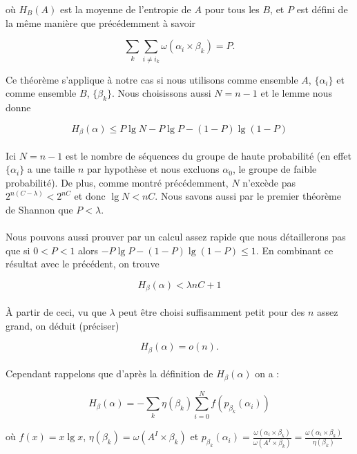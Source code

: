 	
	où $H_B(A)$ est la moyenne de l'entropie de $A$ pour tous
	les $B$, et $P$ est défini de la même manière que précédemment à savoir
	
	\[\sum_k\sum_{i\neq i_k}\omega(\alpha_i \times \beta_k) = P.\]	
	
	Ce théorème s'applique à notre cas si nous utilisons comme ensemble $A$,
	$\{\alpha_i\}$ et comme ensemble $B$, $\{\beta_k\}$. Nous choisissons
	aussi $N = n-1$ et le lemme nous donne
	
	\[H_\beta(\alpha)\le P\lg N - P\lg P - (1-P)\lg(1-P)\]
	
	\paragraph{}
	Ici $N = n-1$ est le nombre de séquences du groupe de haute probabilité 
	(en effet $\{\alpha_i\}$ a une taille $n$ par hypothèse et nous excluons
	$\alpha_0$, le groupe de faible probabilité). De plus, comme montré 
	précédemment, $N$ n'excède pas $2^{n(C-\lambda)}<2^{nC}$ et donc 
	$\lg N<nC$. Nous savons aussi par le premier théorème de Shannon 
	que $P<\lambda$.
	
	\paragraph{}
	Nous pouvons aussi prouver par un calcul assez rapide que nous détaillerons 
	pas que si $0<P<1$ alors $-P\lg P -(1-P)\lg(1-P)\le 1$. En combinant ce 
	résultat avec le précédent,	on trouve
	
	\[H_\beta(\alpha) < \lambda nC + 1\]
	
	\paragraph{}
	À partir de ceci, vu que $\lambda$ peut être choisi suffisamment petit pour
	 des $n$ assez grand, on déduit (préciser)
	
	\[H_\beta(\alpha)=o(n).\]
	
	\paragraph{}
	Cependant rappelons que d'après la définition de $H_\beta(\alpha)$ on a :
	
	\[
		H_\beta(\alpha) = 
		- \sum_k\eta(\beta_k)\sum_{i=0}^Nf(p_{\beta_k}(\alpha_i))
	\]
	
	où $f(x) = x \lg x$, $\eta(\beta_k) = \omega(A^I \times \beta_k)$ 
	et 
		$p_{\beta_k}(\alpha_i) = 
		\frac{\omega(\alpha_i \times \beta_k)}{\omega(A^I \times \beta_k)}=
		\frac{\omega(\alpha_i \times \beta_k)}{\eta(\beta_k)}$	
	
